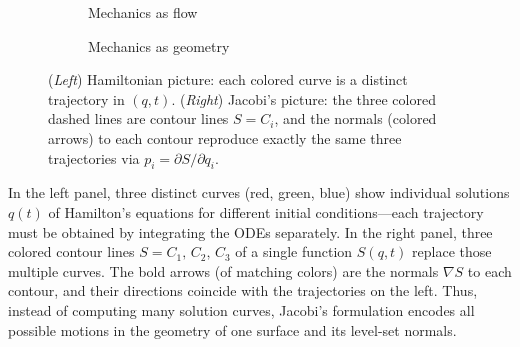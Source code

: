 \begin{figure}[H]
  \centering
  \begin{subfigure}[b]{0.45\textwidth}
    \centering
    \caption{Mechanics as flow}
  \end{subfigure}
  \quad
  \begin{subfigure}[b]{0.45\textwidth}
    \centering
    \caption{Mechanics as geometry}
  \end{subfigure}
  \caption{%
  (\emph{Left}) Hamiltonian picture: each colored curve is a distinct trajectory in \((q,t)\).  
  (\emph{Right}) Jacobi’s picture: the three colored dashed lines are contour lines \(S=C_i\), and the normals (colored arrows) to each contour reproduce exactly the same three trajectories via 
  \(\displaystyle p_i=\partial S/\partial q_i\).}
\end{figure}


In the left panel, three distinct curves (red, green, blue) show individual solutions \(q(t)\) of Hamilton’s equations 
for different initial conditions—each trajectory must be obtained by integrating the ODEs separately.  In the right 
panel, three colored contour lines \(S=C_1,\,C_2,\,C_3\) of a single function \(S(q,t)\) replace those multiple curves.  
The bold arrows (of matching colors) are the normals \(\nabla S\) to each contour, and their directions coincide 
with the trajectories on the left.  Thus, instead of computing many solution curves, Jacobi’s formulation encodes 
all possible motions in the geometry of one surface and its level-set normals.




